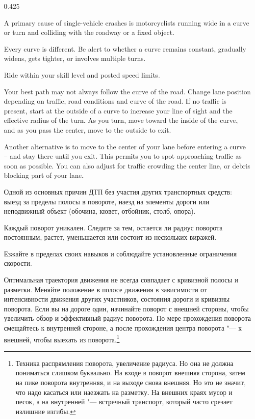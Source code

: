 \begin{langblock}{0.425}
	\begin{eng}
	
	A primary cause of single-vehicle crashes is motorcyclists running wide in a curve or turn and colliding with the roadway or a fixed object.
	
	Every curve is different. Be alert to whether a curve remains constant, gradually widens, gets tighter, or involves multiple turns.
	
	Ride within your skill level and posted speed limits.
	
	Your best path may not always follow the curve of the road. Change lane position depending on traffic, road conditions and curve of the road.  If no traffic is present, start at the outside of a curve to increase your line of sight and the effective radius of the turn. As you turn, move toward the inside of the curve, and as you pass the center, move to the outside to exit.
	
	Another alternative is to move to the center of your lane before entering a curve -- and stay there until you exit. This permits you to spot approaching traffic as soon as possible. You can also adjust for traffic crowding the center line, or debris blocking part of your lane.
	\end{eng}
	\begin{rus}
		
		Одной из основных причин ДТП без участия других транспортных средств: выезд за пределы полосы в повороте, наезд на элементы дороги или неподвижный объект (обочина, кювет, отбойник, столб, опора).
		
		Каждый поворот уникален. Следите за тем, остается ли радиус поворота постоянным, растет, уменьшается или состоит из нескольких виражей.
		
		Езжайте в пределах своих навыков и соблюдайте установленные ограничения скорости.
		
		Оптимальная траектория движения не всегда совпадает с кривизной полосы и разметки. Меняйте положение в полосе движения в зависимости от интенсивности движения других участников, состояния дороги и кривизны поворота. Если вы на дороге один, начинайте поворот с внешней стороны, чтобы увеличить обзор и эффективный радиус поворота. По мере прохождения поворота смещайтесь к внутренней стороне, а после прохождения центра поворота "--- к внешней, чтобы выехать из поворота.\footnote{Техника распрямления поворота, увеличение радиуса. Но она не должна пониматься слишком буквально. На входе в поворот внешняя сторона, затем на пике поворота внутренняя, и на выходе снова внешняя. Но это не значит, что надо касаться или наезжать на разметку. На внешних краях мусор и песок, а на внутренней "--- встречный транспорт, который часто срезает излишние изгибы.}
		

\end{rus}
\end{langblock}
